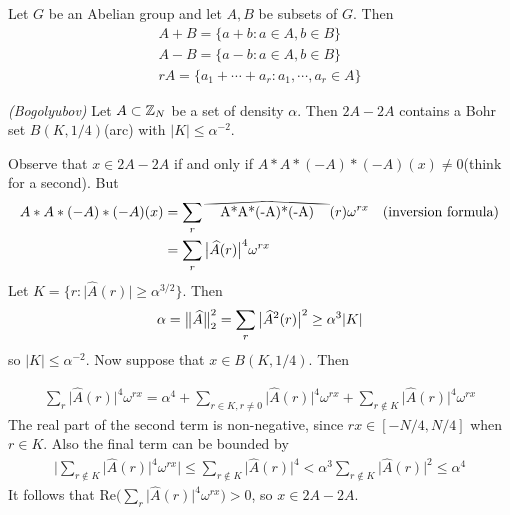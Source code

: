 \documentclass[12pt,a4paper]{report}
\newcommand\reallywidehat[1]{%
\savestack{\tmpbox}{\stretchto{%
  \scaleto{%
    \scalerel*[\widthof{\ensuremath{#1}}]{\kern-.6pt\bigwedge\kern-.6pt}%
    {\rule[-\textheight/2]{1ex}{\textheight}}%
  }{\textheight}%
}{0.5ex}}%
\stackon[1pt]{#1}{\tmpbox}%
}
\renewcommand{\hat}{\widehat}
\newenvironment{proof}
{\begin{changemargin}{1cm}{0.5cm}
	}%
	{\end{changemargin}
}
\begin{document}
 Let $G$ be an Abelian group and let $A,B$ be subsets of $G$. Then 
\begin{align*}
A+B = \{ a+b: a\in A, b\in B\} \\
A-B = \{a-b: a\in A, b\in B\} \\
rA = \{a_1+ \cdots + a_r : a_1,\cdots,a_r \in A  \}
\end{align*}
\s

 \emph{(Bogolyubov)} Let $A\subset \mathbb{Z}_N$ be a set of density $\alpha$. Then $2A-2A$ contains a Bohr set $B(K,1/4)$(arc) with $|K|\leq \alpha^{-2}$.

\begin{proof}
\pf Observe that $x\in 2A-2A$ if and only if $A*A*(-A)*(-A)(x) \neq 0$(think for a second). But
\begin{align*}
A*A*(-A)*(-A)(x) &= \sum_{r} \reallywidehat{A*A*(-A)*(-A)}(r) \omega^{rx} \quad \text{(inversion formula)} \\
&= \sum_r  \big| \hat{A}(r) \big|^4 \omega^{rx}
\end{align*}
Let $K = \{r: \big| \hat{A}(r) \big| \geq \alpha^{3/2} \}$. Then 
\begin{align*}
\alpha = \norms{\hat{A}}{2}^2 = \sum_{r} \big| \hat{A}^2(r) \big|^2 \geq \alpha^3 |K|
\end{align*}
so $|K| \leq \alpha^{-2}$.
\quad Now suppose that $x\in B(K,1/4)$. Then 

\begin{align*}
\sum_{r} \big| \hat{A}(r)\big|^4 \omega^{rx}  = \alpha^4 + \sum_{r\in K,r\neq 0} \big| \hat{A}(r)\big|^4 \omega^{rx} + \sum_{r \notin K} \big| \hat{A}(r)\big|^4 \omega^{rx}
\end{align*}
The real part of the second term is non-negative, since $rx\in [-N/4,N/4]$ when $r\in K$. Also the final term can be bounded by
\begin{align*}
\Big| \sum_{r \notin K} \big| \hat{A}(r)\big|^4 \omega^{rx} \Big| \leq \sum_{r \notin K} \big| \hat{A}(r)\big|^4 < \alpha^3 \sum_{r \notin K} \big| \hat{A}(r)\big|^2 \leq \alpha^4
\end{align*}
It follows that $\text{Re}\Big( \sum_r  \big| \hat{A}(r) \big|^4 \omega^{rx} \Big) >0$, so $x\in 2A-2A$.

\eop
\end{proof}
\s
\end{document}
